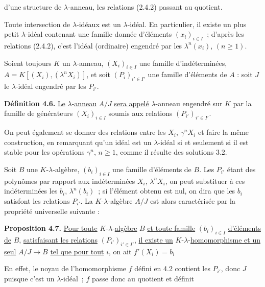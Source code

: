 
d'une
structure de \(\lambda\)-anneau, les relations (2.4.2) passant au quotient.

Toute intersection de \(\lambda\)-idéaux est un \(\lambda\)-idéal. En particulier, il existe un plus petit \(\lambda\)-idéal contenant une famille donnée d'éléments \((x_i)_{i\in I}\)~; d'après les relations (2.4.2), c'est l'idéal (ordinaire) engendré par les \(\lambda^n(x_i)\), \((n\ge1)\).

Soient toujours \(K\) un \(\lambda\)-anneau, \((X_i)_{i\in I}\) une famille d'indéterminées, \(A=K[(X_i),(\lambda^n X_i)]\), et soit \((P_i)_{i'\in I'}\) une famille d'éléments de \(A\) : soit \(J\) le \(\lambda\)-idéal engendré par les \(P_{i'}\).

\textbf{Définition 4.6.} \uline{Le} \(\lambda\)-\uline{anneau} \(A/J\) \uline{sera appelé} \(\lambda\)-anneau engendré sur \(K\) par la famille de générateurs \((X_i)_{i\in I}\) soumis aux relations \((P_{i'})_{i'\in I'}\).

On peut également se donner des relations entre les \(X_i\), \(\gamma^n X_i\) et faire la même construction, en remarquant qu'un idéal est un \(\lambda\)-idéal si et seulement si il est stable pour les opérations \(\gamma^n\), \(n\ge1\), comme il résulte des solutions 3.2.

Soit \(B\) une \(K\)-\(\lambda\)-algèbre, \((b_i)_{i\in I}\) une famille d'éléments de \(B\). Les \(P_{i'}\) étant des polynômes par rapport aux indéterminées \(X_i\), \(\lambda^n X_i\), on peut substituer à ces indéterminées les \(b_i\), \(\lambda^n(b_i)\)~; si l'élément obtenu est nul, on dira que les \(b_i\) satisfont les relations \(P_{i'}\). La \(K\)-\(\lambda\)-algèbre \(A/J\) est alors caractérisée par la propriété universelle suivante :

\textbf{Proposition 4.7.} \uline{Pour toute} \(K\)-\(\lambda\)-\uline{algèbre} \(B\) \uline{et toute famille} \((b_i)_{i\in I}\) \uline{d'éléments de} \(B\), \uline{satisfaisant les relations} \((P_{i'})_{i'\in I'}\), \uline{il existe un} \(K\)-\(\lambda\)-\uline{homomorphisme et un seul} \(A/J\to B\) \uline{tel que pour tout} \(i\), on ait \(f'(X_i)=b_i\)

En effet, le noyau de l'homomorphisme \(f\) défini en 4.2 contient les \(P_{i'}\), donc \(J\) puisque c'est un \(\lambda\)-idéal~; \(f\) passe donc au quotient et définit 
